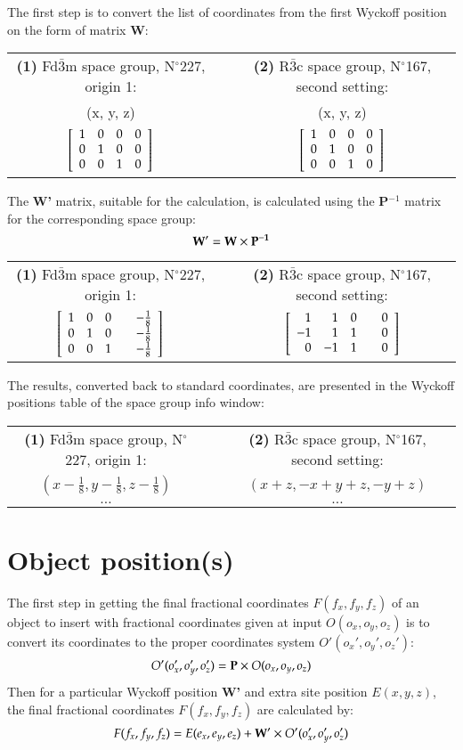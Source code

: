 The first step is to convert the list of coordinates from the first Wyckoff position on the form of matrix {\bf{W}}: \\[0.25cm]
\begin{tabular}{cp{1cm}c}
{\bf{(1)}} Fd$\bar{3}$m space group, N$^\circ$227, origin 1: & & {\bf{(2)}} R$\bar{3}$c space group, N$^\circ$167, second setting: \\[0.25cm]
	(x, y, z) & & (x, y, z) \\[0.25cm]
$\left[\begin{array}{rrrr} 1 & 0 & 0 & 0 \\ 0 & 1 & 0 & 0 \\ 0 & 0 & 1 & 0 \end{array}\right]$ & &
$\left[\begin{array}{rrrr} 1 & 0 & 0 & 0 \\ 0 & 1 & 0 & 0 \\ 0 & 0 & 1 & 0 \end{array}\right]$ \\[0.25cm]
\end{tabular}
The {\bf{W'}} matrix, suitable for the calculation, is calculated using the {\bf{P$^{-1}$}} matrix for the corresponding space group:
\begin{equation}
	{\bf{W'}} = {\bf{W}} \times {\bf{P^{-1}}}
\end{equation}
\begin{tabular}{cp{1cm}c}
{\bf{(1)}} Fd$\bar{3}$m space group, N$^\circ$227, origin 1: & & {\bf{(2)}} R$\bar{3}$c space group, N$^\circ$167, second setting: \\[0.25cm]
$\left[\begin{array}{rrrr} 1 & 0 & 0 & \quad -\frac{1}{8} \\ 0 & 1 & 0 & \quad -\frac{1}{8} \\ 0 & 0 & 1 & \quad -\frac{1}{8} \end{array}\right]$ & &
$\left[\begin{array}{rrrr} 1 & 1 & 0 & \quad 0 \\ -1 & 1 & 1 & \quad 0 \\ 0 & -1 & 1 & \quad 0 \end{array}\right]$ \\[0.25cm]
\end{tabular}
The results, converted back to standard coordinates, are presented in the Wyckoff positions table of the space group info window:\\[0.25cm]
\begin{tabular}{cp{1cm}c}
{\bf{(1)}} Fd$\bar{3}$m space group, N$^\circ$227, origin 1: & & {\bf{(2)}} R$\bar{3}$c space group, N$^\circ$167, second setting: \\[0.25cm]
$(x - \frac{1}{8}, y - \frac{1}{8}, z - \frac{1}{8})$ & & $(x + z, - x + y + z, - y  + z)$ \\
	$\dots$ & & $\dots$ 
\end{tabular}

\section*{Object position(s)}

The first step in getting the final fractional coordinates $F(f_x, f_y, f_z)$ of an object to insert with fractional coordinates given at input $O(o_x, o_y, o_z)$
is to convert its coordinates to the proper coordinates system $O'(o_x', o_y', o_z')$: 
\begin{equation}
O'(o_x', o_y', o_z') = {\bf{P}} \times O(o_x, o_y, o_z)
\end{equation}
Then for a particular Wyckoff position {\bf{W'}} and extra site position $E(x,y,z)$, the final fractional coordinates $F(f_x, f_y, f_z)$ are calculated by:
\begin{equation}
F(f_x, f_y, f_z) = E(e_x,e_y,e_z) + {\bf{W'}} \times O'(o_x', o_y', o_z')
\end{equation}

